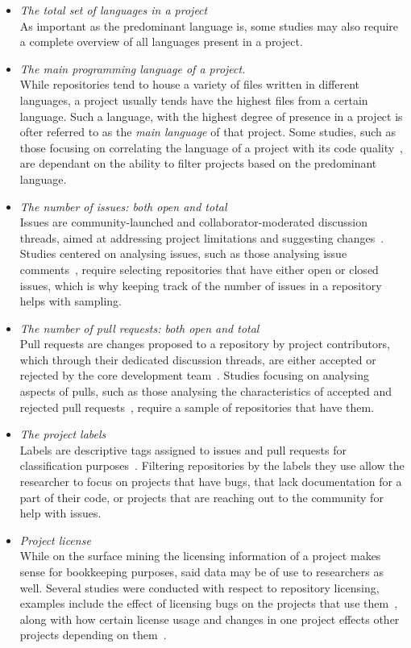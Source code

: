 \begin{itemize}
    \item \textit{The total set of languages in a project}
    \\As important as the predominant language is, some studies may also require a complete overview of all languages present in a project.
    \item \textit{The main programming language of a project.}
    \\While repositories tend to house a variety of files written in different languages, a project usually tends have the highest files from a certain language. Such a language, with the highest degree of presence in a project is ofter referred to as the \textit{main language} of that project. Some studies, such as those focusing on correlating the language of a project with its code quality~\cite{QUALITY}, are dependant on the ability to filter projects based on the predominant language.
    \item \textit{The number of issues: both open and total}
    \\Issues are community-launched and collaborator-moderated discussion threads, aimed at addressing project limitations and suggesting changes~\cite{GITHUBHELP}. Studies centered on analysing issues, such as those analysing issue comments~\cite{ISSUES}, require selecting repositories that have either open or closed issues, which is why keeping track of the number of issues in a repository helps with sampling.
    \item \textit{The number of pull requests: both open and total}
    \\Pull requests are changes proposed to a repository by project contributors, which through their dedicated discussion threads, are either accepted or rejected by the core development team~\cite{GITHUBHELP}. Studies focusing on analysing aspects of pulls, such as those analysing the characteristics of accepted and rejected pull requests~\cite{PULLS}, require a sample of repositories that have them.
    \item \textit{The project labels}
    \\Labels are descriptive tags assigned to issues and pull requests for classification purposes~\cite{LABELS}. Filtering repositories by the labels they use allow the researcher to focus on projects that have bugs, that lack documentation for a part of their code, or projects that are reaching out to the community for help with issues.
    \item \textit{Project license}
    \\While on the surface mining the licensing information of a project makes sense for bookkeeping purposes, said data may be of use to researchers as well. Several studies were conducted with respect to repository licensing, examples include the effect of licensing bugs on the projects that use them~\cite{LICENSEBUGS}, along with how certain license usage and changes in one project effects other projects depending on them~\cite{LICENSECHANGE}.

\end{itemize}
